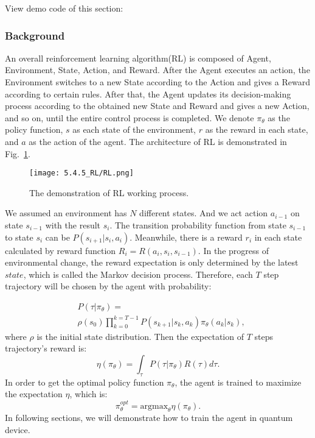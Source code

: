 View demo code of this section: 

\subsubsection{Background}

An overall reinforcement learning algorithm(RL) is composed of Agent, Environment, State, Action, and Reward. After the Agent executes an action, the Environment switches to a new State according to the Action and gives a Reward according to certain rules. After that, the Agent updates its decision-making process according to the obtained new State and Reward and gives a new Action, and so on, until the entire control process is completed. We denote $\pi_{\theta}$ as the policy function, $s$ as each state of the environment, $r$ as the reward in each state, and $a$ as the action of the agent. The architecture of RL is demonstrated in Fig.~\ref{RL_frame}.
\begin{figure}[ht]
  \centering
  \texttt{[image: 5.4.5\_RL/RL.png]}
  \caption{\label{RL_frame} The demonstration of RL working process.}
\end{figure}

We assumed an environment has $N$ different states. And we act action $a_{i-1}$ on state $s_{i-1}$ with the result $s_{i}$. The transition probability function from state $s_{i-1}$ to state $s_{i}$ can be $P(s_{i+1}|s_{i},a_{i})$. Meanwhile, there is a reward $r_i$ in each state calculated by reward function $R_i=R(a_i,s_i,s_{i-1})$. In the progress of environmental change, the reward expectation is only determined by the latest $state$, which is called the Markov decision process. Therefore, each $T$ step trajectory will be chosen by the agent with probability:

\begin{equation}
    \begin{split}
        &P(\tau|\pi_{\theta})=\\
        &\rho(s_0)\prod_{k=0}^{k=T-1}P(s_{k+1}|s_{k},a_{k})\pi_{\theta}(a_{k}|s_{k}),
    \end{split}
\end{equation}
where $\rho$ is the initial state distribution. Then the expectation of $T$ steps trajectory's reward is:
\begin{equation}
    \eta(\pi_{\theta})=\int_{\tau}P(\tau|\pi_{\theta})R(\tau)d\tau.
\end{equation}
In order to get the optimal policy function $\pi_{\theta}$, the agent is trained to maximize the expectation $\eta$, which is:
\begin{equation}
    \pi_{\theta}^{opt}=\mathrm{argmax}_{\theta}\eta(\pi_{\theta}).
\end{equation}
In following sections, we will demonstrate how to train the agent in quantum device.

